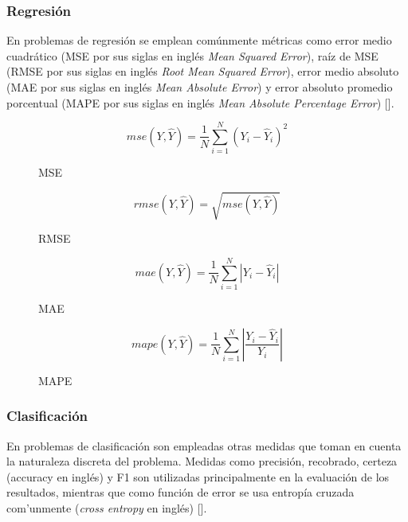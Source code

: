 \subsubsection{Regresión}

En problemas de regresión se emplean comúnmente
métricas como error medio cuadrático (MSE por sus siglas en inglés \emph{Mean Squared Error}), 
raíz de MSE (RMSE por sus siglas en inglés \emph{Root Mean Squared Error}),
error medio absoluto (MAE por sus siglas en inglés \emph{Mean Absolute Error}) y error absoluto promedio porcentual 
(MAPE por sus siglas en inglés \emph{Mean Absolute Percentage Error}) [\cite{botchkarev2019new}].

\begin{figure}
	\begin{equation}\label{metric:MSE}
		mse(Y, \hat{Y}) = \frac{1}{N} \sum^{N}_{i=1} (Y_i - \hat{Y}_i)^2
	\end{equation}
	\caption{MSE}
\end{figure}

\begin{figure}
	\begin{equation}\label{metric:RMSE}
		rmse(Y, \hat{Y}) = \sqrt{mse(Y, \hat{Y})}
	\end{equation}
	\caption{RMSE}
\end{figure}

\begin{figure}
	\begin{equation}\label{metric:MAE}
		mae(Y, \hat{Y}) = \frac{1}{N} \sum^{N}_{i=1} |Y_i - \hat{Y}_i|
	\end{equation}
	\caption{MAE}
\end{figure}

\begin{figure}
	\begin{equation}\label{metric:MAPE}
		mape(Y, \hat{Y}) = \frac{1}{N} \sum^{N}_{i=1} |\frac{Y_i - \hat{Y}_i}{Y_i}|
	\end{equation}
	\caption{MAPE}
\end{figure}

\subsubsection{Clasificación}

En problemas de clasificación son empleadas otras medidas que toman en cuenta la naturaleza discreta del problema. 
Medidas como precisión, recobrado, certeza (accuracy en inglés) y F1 son utilizadas principalmente en la 
evaluación de los resultados, mientras que como función de error se usa entropía cruzada com'unmente 
(\emph{cross entropy} en inglés) [\cite{grandini2020metrics}].

